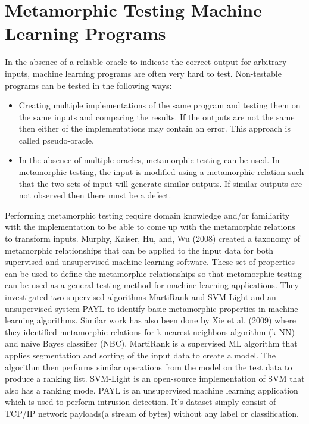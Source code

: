 \section{Metamorphic Testing Machine Learning Programs}\label{2.4MetamorphicTestingMachineLearning}

In the absence of a reliable oracle to indicate the correct output for arbitrary inputs, machine learning programs are often very hard to test. Non-testable programs can be tested in the following ways:
\begin{itemize}
  \item Creating multiple implementations of the same program and testing them on the same inputs and comparing the results. If the outputs are not the same then either of the implementations may contain an error. This approach is called pseudo-oracle.
  \item In the absence of multiple oracles, metamorphic testing can be used. In metamorphic testing, the input is modified using a metamorphic relation such that the two sets of input will generate similar outputs. If similar outputs are not observed then there must be a defect.
\end{itemize}

Performing metamorphic testing require domain knowledge and/or familiarity with the implementation to be able to come up with the metamorphic relations to transform inputs. Murphy, Kaiser, Hu, and, Wu (2008) created a taxonomy of metamorphic relationships that can be applied to the input data for both supervised and unsupervised machine learning software. These set of properties can be used to define the metamorphic relationships so that metamorphic testing can be used as a general testing method for machine learning applications\cite{Murphy2008}. They investigated two supervised algorithms MartiRank and SVM-Light and an unsupervised system PAYL to identify basic metamorphic properties in machine learning algorithms. Similar work has also been done by Xie et al. (2009) where they identified metamorphic relations for k-nearest neighbors algorithm (k-NN) and naïve Bayes classifier (NBC).
MartiRank is a supervised ML algorithm that applies segmentation and sorting of the input data to create a model. The algorithm then performs similar operations from the model on the test data to produce a ranking list. 
SVM-Light is an open-source implementation of SVM that also has a ranking mode.
PAYL is an unsupervised machine learning application which is used to perform intrusion detection. It's dataset simply consist of TCP/IP network payloads(a stream of bytes) without any label or classification.

